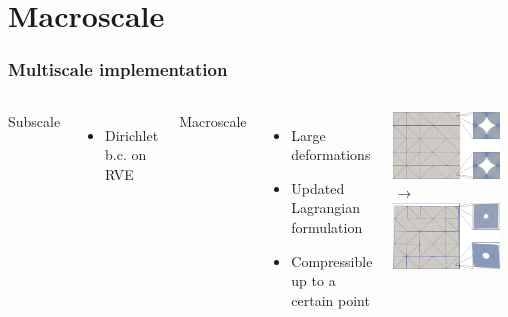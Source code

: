 \documentclass[11pt,mathserif]{beamer}
\begin{document}
\section{Macroscale}
\begin{frame}
 \frametitle{Multiscale implementation}
\begin{columns}
 Subscale
 \begin{itemize}
  \item Dirichlet b.c. on RVE
 \end{itemize}

 Macroscale
 \begin{itemize}
  \item Large deformations
   \item Updated Lagrangian formulation
  \item Compressible up to a certain point
 \end{itemize}


\begin{center}
 \includegraphics[width=0.9\textwidth]{figures/Sintering_5x5_000.png}\\
 $\longrightarrow$\\[0.5em]
 \includegraphics[width=0.9\textwidth]{figures/Sintering_5x5_114.png}
\end{center}
\end{columns}
\end{frame}
\end{document}
